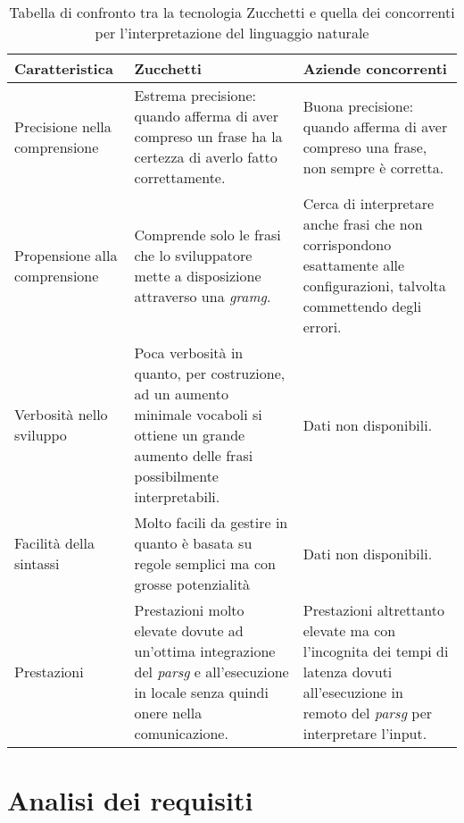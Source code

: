 \begin{table}
	\begin{tabularx}{\textwidth}{|X|X|X|}
		\hline
		\textbf{Caratteristica} & \textbf{Zucchetti} & \textbf{Aziende concorrenti} \\\hline
		
		Precisione nella comprensione & Estrema precisione: quando afferma di aver compreso un frase ha la certezza di averlo fatto correttamente.  & Buona precisione: quando afferma di aver compreso una frase, non sempre è corretta. \\
		\hline
		Propensione alla comprensione & Comprende solo le frasi che lo sviluppatore mette a disposizione attraverso una \emph{\gls{gramg}}. & Cerca di interpretare anche frasi che non corrispondono esattamente alle configurazioni, talvolta commettendo degli errori. \\
		\hline
		Verbosità nello sviluppo & Poca verbosità in quanto, per costruzione, ad un aumento minimale vocaboli si ottiene un grande aumento delle frasi possibilmente interpretabili. & Dati non disponibili. \\
		\hline
		Facilità della sintassi & Molto facili da gestire in quanto è basata su regole semplici ma con grosse potenzialità & Dati non disponibili. \\
		\hline
		Prestazioni & Prestazioni molto elevate dovute ad un'ottima integrazione del \emph{\gls{parsg}} e all'esecuzione in locale senza quindi onere nella comunicazione. & Prestazioni altrettanto elevate ma con l'incognita dei tempi di latenza dovuti all'esecuzione in remoto del \emph{\gls{parsg}} per interpretare l'input. \\
		\hline
	\end{tabularx}
	\caption{Tabella di confronto tra la tecnologia Zucchetti e quella dei concorrenti per l'interpretazione del linguaggio naturale}
\end{table}

\section{Analisi dei requisiti}
